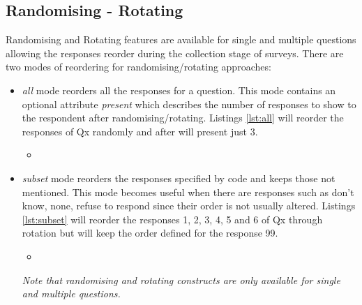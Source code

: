\documentclass{article}
\newcommand{\insertcode}[3]{\begin{itemize}\item[]\end{itemize}} %
\begin{document}
	\subsection{Randomising - Rotating}
Randomising and Rotating features are available for single and multiple questions allowing the responses reorder during the collection stage of surveys. There are two modes of reordering for randomising/rotating approaches:
\begin{itemize}
	\item \emph{all} mode reorders all the responses for a question. This mode contains an optional attribute \emph{present} which describes the number of responses to show to the respondent after randomising/rotating. Listings \ref{lst:all} will reorder the responses of Qx randomly and after will present just 3.
\insertcode{"scripts/all.xml"}{All mode example for randomising responses}{lst:all}
	\item \emph{subset} mode reorders the responses specified by code and keeps those not mentioned. This mode becomes useful when there are responses such as don't know, none, refuse to respond since their order is not usually altered. Listings \ref{lst:subset} will reorder the responses 1, 2, 3, 4, 5 and 6 of Qx through rotation but will keep the order defined for the response 99.
\insertcode{"scripts/subset.xml"}{Subset mode example for rotating responses}{lst:subset}

\emph{Note that randomising and rotating constructs are only available for single and multiple questions.}
\end{itemize}
\end{document}
